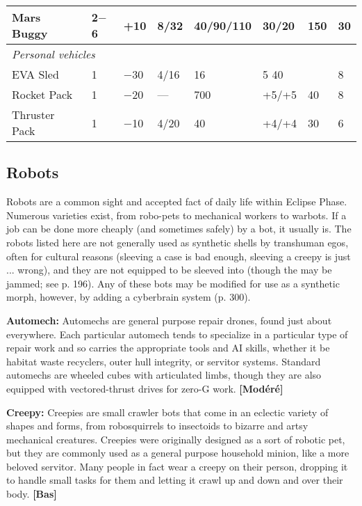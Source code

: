 {{\begin{table}
\begin{tabularx}{\textwidth}{|l|X|X|X|X|X|X|X|}
Mars Buggy	&2$-$6	&+10	&8/32	&40/90/110	&30/20	&150	&30 \\ \hline

\multicolumn{8}{|l|}{\emph{Personal vehicles}} \\ \hline

EVA Sled	&1	&$-$30	&4/16	&16	&5 40	&&8 \\ \hline

Rocket Pack	&1	&$-$20	&--- &700	&+5/+5	&40	&8 \\ \hline

Thruster Pack	&1	&$-$10	&4/20	&40	&+4/+4	&30	&6 \\ \hline

\end{tabularx} \label{tab:groundcraft-personal} \end{table} 



\subsection{Robots} \label{sec:robots} 

Robots are a common sight and accepted fact of daily life within Eclipse Phase. Numerous varieties exist, from robo-pets to mechanical workers to warbots. If a job can be done more cheaply (and sometimes safely) by a bot, it usually is. The robots listed here are not generally used as synthetic shells by transhuman egos, often for cultural reasons (sleeving a case is bad enough, sleeving a creepy is just ... wrong), and they are not equipped to be sleeved into (though the may be jammed; see p. 196). Any of these bots may be modified for use as a synthetic morph, however, by adding a cyberbrain system (p. 300). 

\textbf{Automech:} Automechs are general purpose repair drones, found just about everywhere. Each particular automech tends to specialize in a particular type of repair work and so carries the appropriate tools and AI skills, whether it be habitat waste recyclers, outer hull integrity, or servitor systems. Standard automechs are wheeled cubes with articulated limbs, though they are also equipped with vectored-thrust drives for zero-G work. \textbf{[Modéré]} 

\textbf{Creepy:} Creepies are small crawler bots that come in an eclectic variety of shapes and forms, from robosquirrels to insectoids to bizarre and artsy mechanical creatures. Creepies were originally designed as a sort of robotic pet, but they are commonly used as a general purpose household minion, like a more beloved servitor. Many people in fact wear a creepy on their person, dropping it to handle small tasks for them and letting it crawl up and down and over their body. \textbf{[Bas]} 

}}

